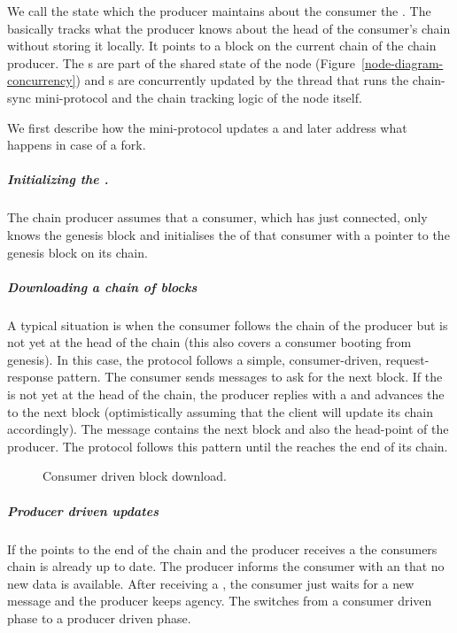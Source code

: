 We call the state which the producer maintains about the consumer the \readpointer{}.
The \readpointer{} basically tracks what the producer knows about the head of
the consumer's chain without storing it locally.
It points to a block on the current chain of the chain producer.
The \readpointer{}s are part of the shared state of the node (Figure~\ref{node-diagram-concurrency}) and
\readpointer{}s are concurrently updated by the thread that runs the chain-sync mini-protocol and the
chain tracking logic of the node itself.

We first describe how the mini-protocol updates a \readpointer{} and later address what happens in case
of a fork.
\subparagraph{Initializing the \readpointer{}.}
The chain producer assumes that a consumer, which has just connected,
only knows the genesis block and initialises the \readpointer{} of that consumer
with a pointer to the genesis block on its chain.

\subparagraph{Downloading a chain of blocks}
A typical situation is when the consumer follows the chain of the producer but is not yet at the head of the
chain (this also covers a consumer booting from genesis).
In this case, the protocol follows a simple, consumer-driven, request-response pattern.
The consumer sends \RequestNext{} messages to ask for the next block.
If the \readpointer{} is not yet at the head of the chain,
the producer replies with a \RollForward{} and advances the \readpointer{} to
the next block (optimistically assuming that the client will update its chain
accordingly).
The \RollForward{} message contains the next block and also the head-point of the producer.
The protocol follows this pattern until the \readpointer{} reaches the end of its chain.

\begin{figure}[ht]
\begin{center}
\end{center}
\caption{Consumer driven block download.}
\label{read-pointer-consumer-driver}
\end{figure}

\subparagraph{Producer driven updates}
If the \readpointer{} points to the end of the chain and the producer receives
a \RequestNext{}
the consumers chain is already up to date.
The producer informs the consumer with an \AwaitReply{} that no new data is available.
After receiving a \AwaitReply, the consumer just waits for a new message and the producer keeps agency.
The \AwaitReply{} switches from a consumer driven phase to a producer driven phase.

